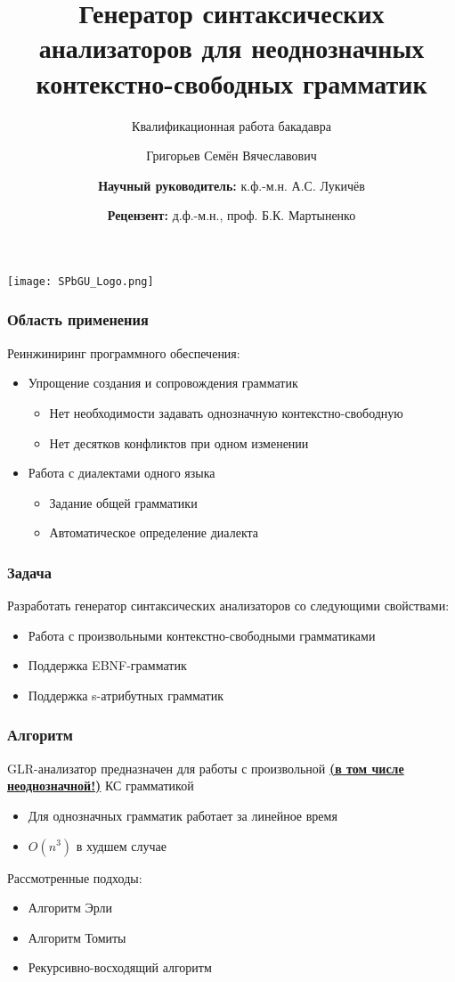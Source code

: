 \documentclass{beamer}
\title[]{Генератор синтаксических анализаторов для неоднозначных контекстно-свободных грамматик}
\subtitle[asdasd]{Квалификационная работа бакадавра}
\institute[СПбГУ]{
Санкт-Петербургский государственный университет \\
Математико-Механический факультет \\
Кафедра системного программирования }
\author[Григорьев С.В.]{Григорьев Семён Вячеславович \\
  \and  
  {\bfseries Научный руководитель:} к.ф.-м.н. А.С. Лукичёв \\ 
  \and
  {\bfseries Рецензент:} д.ф.-м.н., проф. Б.К. Мартыненко  
}
\begin{document}
{

\begin{frame}
\begin{center}
{\texttt{[image: SPbGU\_Logo.png]}}
\end{center}
\titlepage
\end{frame}
}

\begin{frame}
	\transwipe[direction=90]
	\frametitle{Область применения}
Реинжиниринг программного обеспечения:
	\begin{itemize}
		\item Упрощение создания и сопровождения грамматик
			\begin{itemize}
				\item Нет необходимости задавать однозначную контекстно-свободную
				\item Нет десятков конфликтов при одном изменении
			\end{itemize}
		\item Работа с диалектами одного языка
			\begin{itemize}
				\item Задание общей грамматики
				\item Автоматическое определение диалекта
			\end{itemize}		
	\end{itemize}
\end{frame}


\begin{frame}
	\transwipe[direction=90]
	\frametitle{Задача}
	Разработать генератор синтаксических анализаторов со следующими свойствами:  
	\begin{itemize}
		\item Работа с произвольными контекстно-свободными грамматиками
		\item Поддержка EBNF-грамматик
		\item Поддержка s-атрибутных грамматик
	\end{itemize}
\end{frame}

\begin{frame}
	\transwipe[direction=90]
	\frametitle{Алгоритм}
	 GLR-анализатор предназначен для работы с произвольной {\bfseries{\underline {(в том числе неоднозначной!)}}} КС  грамматикой
	\begin{itemize}
		\item Для однозначных грамматик работает за линейное время
    \item {$O(n^{3})$ в худшем случае}
	\end{itemize}
	Рассмотренные подходы:
	\begin{itemize}
			\item Алгоритм Эрли				
			\item Алгоритм Томиты				
			\item Рекурсивно-восходящий алгоритм				
	\end{itemize}					
\end{frame}
\end{document}
